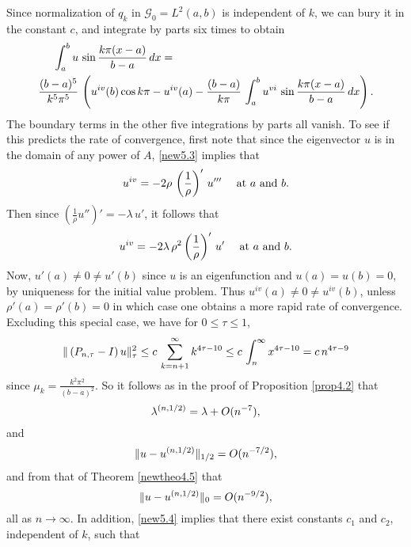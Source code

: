 \documentclass[final]{siamltex}
\numberwithin{equation}{section}
\begin{document}
Since normalization of $q_k$ in $\mathcal{G}_0=L^2(a,b)$ is independent of $k$, we can bury it in the constant $c$, and integrate by parts six times to obtain
\begin{align} \label{new5.4}
\int_{a}^{b} u \, & \sin \frac{k \pi (x-a)}{b-a} \,  dx = \notag \\
\frac{(b-a)^5}{k^5 \pi^5} \,  & \left(u^{iv}(b) \cos k \pi - u^{iv}(a)-
\displaystyle{
\frac{(b-a)}{k \pi}\, \int_{a}^{b} u^{vi} \, \sin \frac{k \pi (x-a)}{b-a} \, dx}\right).
\end{align}
The boundary terms in the other five integrations by parts all vanish. To see if this predicts the rate of convergence, first note that since the eigenvector $u$ is in the domain of any power of $A$, \eqref{new5.3} implies that
\begin{equation} \notag
u^{iv} = - 2 \rho \, \left(\frac{1}{\rho}\right)' \, u''' \quad \text{ at } a \text{ and } b.
\end{equation}
Then since $\left( \frac{1}{\rho} u''\right)'= - \lambda \, u'$, it follows that
\begin{equation} \notag
u^{iv} = -2 \lambda \, \rho^2 \left(\frac{1}{\rho}\right)'
\,  u' \quad \text{ at } a \text{ and } b.
\end{equation}
Now, $u'(a)\neq 0 \neq u'(b)$ since $u$ is an eigenfunction and $u(a)=u(b)=0$, by uniqueness for the initial value problem. Thus $u^{iv} (a) \neq 0 \neq u^{iv}(b)$, unless $\rho'(a) =\rho'(b)=0$ in which case one obtains a more rapid rate of convergence. Excluding this special case, we have for $0 \le \tau \le 1$,
\begin{equation} \notag
\|\left(P_{n, \tau} - I \right) u \|_{\tau}^2 \le c \, \sum_{k=n+1}^{\infty} k^{4 \tau -10} \le c \, \int_{n}^{\infty} x^{4 \tau-10} = c \, n^{4 \tau -9}
\end{equation}
since $\mu_k = \frac{k^2 \pi^2}{(b-a)^2}$. So it follows as in the proof of Proposition \ref{prop4.2} that
\begin{equation} \notag
\lambda^{(n,1/2)}= \lambda+ O(n^{-7}),
\end{equation}
and
\begin{equation} \notag
\|u- u^{(n,1/2)}\|_{1/2}= O(n^{-7/2}),
\end{equation}
and from that of Theorem \ref{newtheo4.5} that
\begin{equation} \notag
\|u-u^{(n,1/2)}\|_0 = O(n^{-9/2}),
\end{equation}
all as $n\to \infty$. In addition, \eqref{new5.4} implies that there exist constants $c_1$ and $c_2$, independent of $k$, such that
\end{document}
